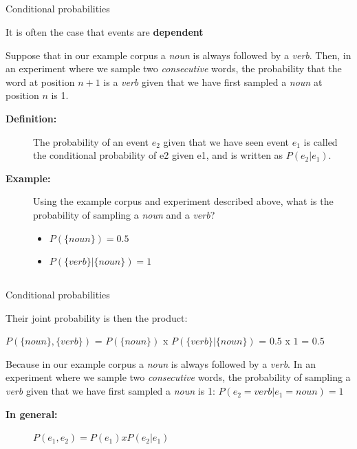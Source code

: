 \documentclass[9pt,xcolor=pdftex,dvipsnames,table]{beamer}
\begin{document}
\subsection{}
\begin{frame}{Conditional probabilities}

{\large It is often the case that events are \textbf{dependent}}
\vspace{.25cm}

Suppose that in our example corpus a \emph{noun} is always followed by a
\emph{verb}. Then, in an experiment where we sample two \emph{consecutive} words, the probability that the word at position $n + 1$ is a \emph{verb} given that we have first sampled a \emph{noun} at position $n$ is 1.
\vspace{.5cm}

     \begin{description}
          \item[\textbf{Definition:}]
          The probability of an event $e_2$ given that we have seen event $e_1$ is called the conditional probability of e2 given e1, and is written as $P(e_2 | e_1)$.

          \item[\textbf{Example:}] Using the example corpus and experiment described above, what is the probability of sampling a \emph{noun} and a \emph{verb}?
          
          \begin{itemize}
          	\item $P(\{noun\}) = 0.5$
          	\item $P(\{verb\} | \{noun\}) = 1$
          \end{itemize}
          
     \end{description}
\end{frame}

\subsection{}
\begin{frame}{Conditional probabilities}

{\large Their joint probability is then the product:}
\vspace{.25cm}

$P(\{noun\}, \{verb\})$ = $P(\{noun\})$ x $P(\{verb\} | \{noun\})$ = $0.5$ x $1$ = $0.5$
\vspace{.25cm}

Because in our example corpus a \emph{noun} is always followed by a
\emph{verb}. In an experiment where we sample two \emph{consecutive} words, the probability of sampling a \emph{verb} given that we have first sampled a \emph{noun} is 1: $P(e_2 = verb | e_1 = noun) = 1$
\vspace{.25cm}

     \begin{description}
          \item[\textbf{In general:}] $P(e_1, e_2) = P(e_1) x P(e_2 | e_1)$
     \end{description}
\end{frame}
\end{document}
